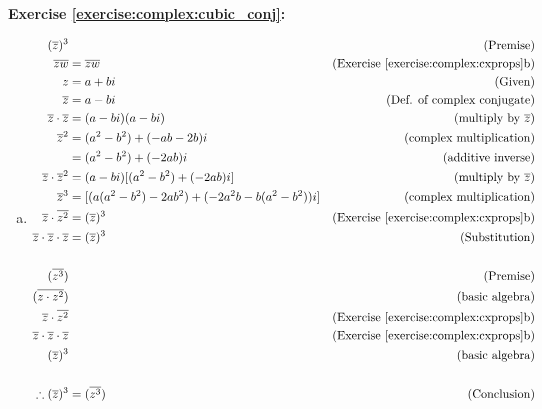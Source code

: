 \noindent\textbf{Exercise \ref{exercise:complex:cubic_conj}:} %
\begin{enumerate}[(a)]
\item
	\begin{align*}
	(\overline{z})^{3} &		&\text{(Premise)}\\
	\overline{z}\overline{w} &= \overline{zw}	&\text{(Exercise 									\ref{exercise:complex:cxprops}b)}\\
	z &= a + bi 		&\text{(Given)}\\
	\overline{z} &= a - bi		&\text{(Def. of complex conjugate)}\\
	\overline{z} \cdot \overline{z} &= (a - bi)(a - bi)		&\text{(multiply by}\ 		\overline{z})\\
	\overline{z}^{2} &= (a^{2} - b^{2}) + (-ab -2b)i		&\text{(complex 				multiplication)}\\
	 &= (a^{2} - b^{2}) + (-2ab)i		&\text{(additive inverse)}\\
	 \overline{z} \cdot \overline{z}^{2} &= (a - bi)[(a^{2} - b^{2}) + 					(-2ab)i]		&\text{(multiply by}\ \overline{z})\\
	 \overline{z}^{3} &= [(a(a^{2} - b^{2}) - 2ab^{2}) + (-2a^{2}b -b(a^{2} - b^{2}))i]		&\text{(complex multiplication)}\\
	 \overline{z} \cdot \overline{z^{2}} &= (\overline{z})^{3} &\text{(Exercise 									\ref{exercise:complex:cxprops}b)}\\
	 \overline{z} \cdot \overline{z} \cdot \overline{z} &= (\overline{z})^{3} &\text{(Substitution)}\\
	 \\
	 (\overline{z^{3}})& &\text{(Premise)}\\
	 (\overline{z \cdot z^{2}})&   &\text{(basic algebra)}\\
	 \overline{z} \cdot \overline{z^{2}}&   &\text{(Exercise 									\ref{exercise:complex:cxprops}b)}\\
	 \overline{z} \cdot \overline{z} \cdot \overline{z}&    &\text{(Exercise 									\ref{exercise:complex:cxprops}b)}\\
	 (\overline{z})^{3}&   &\text{(basic algebra)}\\
	 \\
	 \therefore (\overline{z})^{3} &= (\overline{z^{3}}) &\text{(Conclusion)}
	\end{align*}
	

\end{enumerate}
